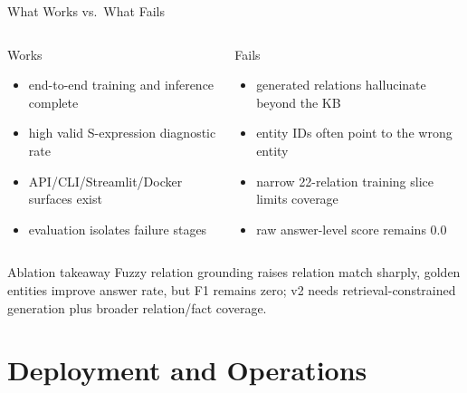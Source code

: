 \begin{frame}[shrink=8]{What Works vs.\ What Fails}
  \begin{columns}[T]
    \begin{block}{Works}
      \small
      \begin{itemize}
        \item end-to-end training and inference complete
        \item high valid S-expression diagnostic rate
        \item API/CLI/Streamlit/Docker surfaces exist
        \item evaluation isolates failure stages
      \end{itemize}
    \end{block}
    \begin{alertblock}{Fails}
      \small
      \begin{itemize}
        \item generated relations hallucinate beyond the KB
        \item entity IDs often point to the wrong entity
        \item narrow 22-relation training slice limits coverage
        \item raw answer-level score remains 0.0
      \end{itemize}
    \end{alertblock}
  \end{columns}
  \vspace{0.15cm}
  \begin{exampleblock}{Ablation takeaway}
    Fuzzy relation grounding raises relation match sharply, golden entities improve answer rate, but F1 remains zero; v2 needs retrieval-constrained generation plus broader relation/fact coverage.
  \end{exampleblock}
\end{frame}

\section{Deployment and Operations}

